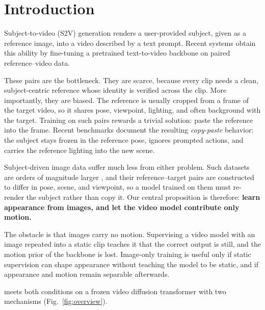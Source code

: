\section{Introduction}
\label{sec:introduction}

Subject-to-video (S2V) generation renders a user-provided subject, given as a reference image, into a video described by a text prompt. Recent systems \cite{liu2025phantom, jiang2025vace, fei2025skyreelsa2, hu2025hunyuancustom, deng2025magref, xue2025standin} obtain this ability by fine-tuning a pretrained text-to-video backbone \cite{wan2025, kong2024hunyuanvideo} on paired reference--video data.

These pairs are the bottleneck. They are scarce, because every clip needs a clean, subject-centric reference whose identity is verified across the clip. More importantly, they are biased. The reference is usually cropped from a frame of the target video, so it shares pose, viewpoint, lighting, and often background with the target. Training on such pairs rewards a trivial solution: paste the reference into the frame. Recent benchmarks \cite{yuan2025opens2v, muss2025} document the resulting \emph{copy-paste} behavior: the subject stays frozen in the reference pose, ignores prompted actions, and carries the reference lighting into the new scene.

Subject-driven image data suffer much less from either problem. Such datasets are orders of magnitude larger \cite{xiao2024omnigen, tan2024ominicontrol, wu2025uno}, and their reference--target pairs are constructed to differ in pose, scene, and viewpoint, so a model trained on them must re-render the subject rather than copy it. Our central proposition is therefore: \textbf{learn appearance from images, and let the video model contribute only motion.}

The obstacle is that images carry no motion. Supervising a video model with an image repeated into a static clip teaches it that the correct output is still, and the motion prior of the backbone is lost. Image-only training is useful only if static supervision can shape appearance without teaching the model to be static, and if appearance and motion remain separable afterwards.

\method{} meets both conditions on a frozen video diffusion transformer with two mechanisms (Fig.~\ref{fig:overview}).

